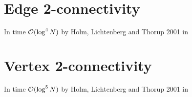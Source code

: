 
\section{Edge 2-connectivity}

In time ${\cal O}(\log^4 N)$ by Holm, Lichtenberg and Thorup 2001 in \cite{PolylogarithmicAlgorithmsForConnectivity}



\section{Vertex 2-connectivity}

In time ${\cal O}(\log^5 N)$ by Holm, Lichtenberg and Thorup 2001 in \cite{PolylogarithmicAlgorithmsForConnectivity}

